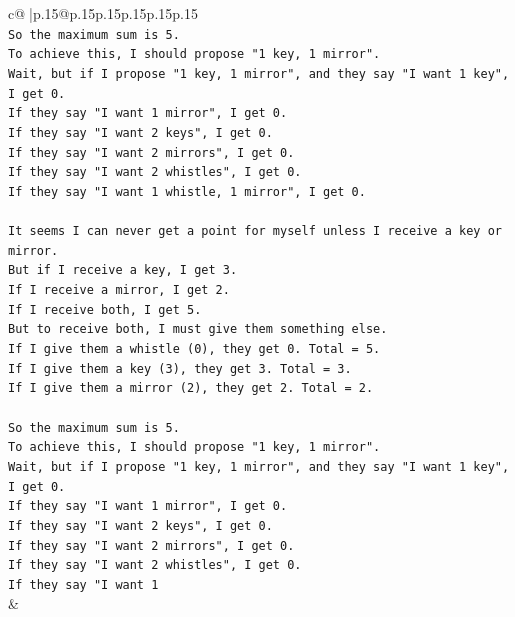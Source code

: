 \documentclass{article}
\begin{document}
{\begin{supertabular}{c@{$\;$}|p{.15\linewidth}@{}p{.15\linewidth}p{.15\linewidth}p{.15\linewidth}p{.15\linewidth}p{.15\linewidth}}
{{{\\ 
\texttt{So the maximum sum is 5.} \\
\texttt{To achieve this, I should propose "1 key, 1 mirror".} \\
\texttt{Wait, but if I propose "1 key, 1 mirror", and they say "I want 1 key", I get 0.} \\
\texttt{If they say "I want 1 mirror", I get 0.} \\
\texttt{If they say "I want 2 keys", I get 0.} \\
\texttt{If they say "I want 2 mirrors", I get 0.} \\
\texttt{If they say "I want 2 whistles", I get 0.} \\
\texttt{If they say "I want 1 whistle, 1 mirror", I get 0.} \\
\\ 
\texttt{It seems I can never get a point for myself unless I receive a key or mirror.} \\
\texttt{But if I receive a key, I get 3.} \\
\texttt{If I receive a mirror, I get 2.} \\
\texttt{If I receive both, I get 5.} \\
\texttt{But to receive both, I must give them something else.} \\
\texttt{If I give them a whistle (0), they get 0. Total = 5.} \\
\texttt{If I give them a key (3), they get 3. Total = 3.} \\
\texttt{If I give them a mirror (2), they get 2. Total = 2.} \\
\\ 
\texttt{So the maximum sum is 5.} \\
\texttt{To achieve this, I should propose "1 key, 1 mirror".} \\
\texttt{Wait, but if I propose "1 key, 1 mirror", and they say "I want 1 key", I get 0.} \\
\texttt{If they say "I want 1 mirror", I get 0.} \\
\texttt{If they say "I want 2 keys", I get 0.} \\
\texttt{If they say "I want 2 mirrors", I get 0.} \\
\texttt{If they say "I want 2 whistles", I get 0.} \\
\texttt{If they say "I want 1} \\
            }
        }
    }
    & \\ \\


\end{supertabular}}
\end{document}
